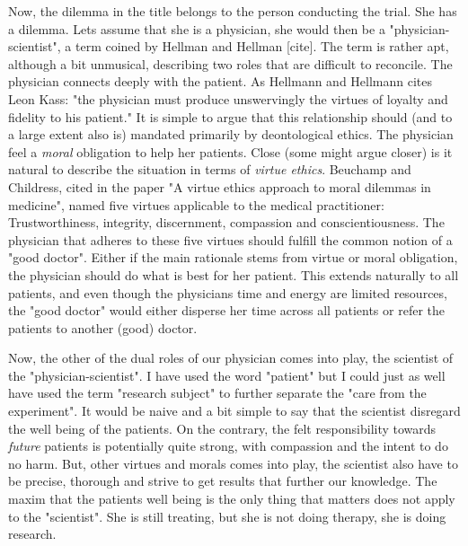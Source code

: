 \documentclass[12p]{article}
\begin{document}

Now, the dilemma in the title belongs to the person conducting the trial.
She has a dilemma.
Lets assume that she is a physician, she would then be a "physician-scientist", a term coined by Hellman and Hellman [cite].
The term is rather apt, although a bit unmusical, describing two roles that are difficult to reconcile.
The physician connects deeply with the patient.
As Hellmann and Hellmann cites Leon Kass: "the physician must produce unswervingly the virtues of loyalty and fidelity to his patient."
It is simple to argue that this relationship should (and to a large extent also is) mandated primarily by deontological ethics.
The physician feel a \emph{moral} obligation to help her patients.
Close (some might argue closer) is it natural to describe the situation in terms of \emph{virtue ethics}.
Beuchamp and Childress, cited in the paper "A virtue ethics approach to moral dilemmas in medicine", named five virtues applicable to the medical practitioner:
Trustworthiness, integrity, discernment, compassion and conscientiousness.
The physician that adheres to these five virtues should fulfill the common notion of a "good doctor".
Either if the main rationale stems from virtue or moral obligation, the physician should do what is best for her patient.
This extends naturally to all patients, and even though the physicians time and energy are limited resources, the "good doctor" would either disperse her time across all patients or refer the patients to another (good) doctor.

Now, the other of the dual roles of our physician comes into play, the scientist of the "physician-scientist".
I have used the word "patient" but I could just as well have used the term "research subject" to further separate the "care from the experiment".
It would be naive and a bit simple to say that the scientist disregard the well being of the patients.
On the contrary, the felt responsibility towards \emph{future} patients is potentially quite strong, with compassion and the intent to do no harm.
But, other virtues and morals comes into play, the scientist also have to be precise, thorough and strive to get results that further our knowledge.
The maxim that the patients well being is the only thing that matters does not apply to the "scientist".
She is still treating, but she is not doing therapy, she is doing research.
\end{document}

